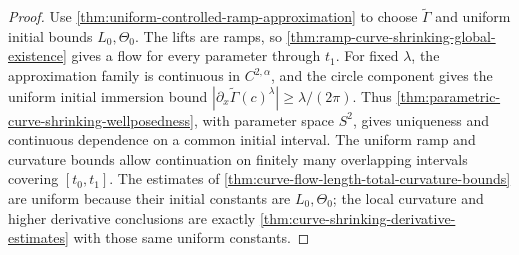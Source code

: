 \begin{proof}
Use \ref{thm:uniform-controlled-ramp-approximation} to choose
$\widetilde\Gamma$ and uniform initial bounds $L_0,\Theta_0$.  The lifts are
ramps, so \ref{thm:ramp-curve-shrinking-global-existence} gives a flow for
every parameter through $t_1$.  For fixed $\lambda$, the approximation family
is continuous in $C^{2,\alpha}$, and the circle component gives the uniform
initial immersion bound $|\partial_x\widetilde\Gamma(c)^\lambda|
\ge\lambda/(2\pi)$.  Thus
\ref{thm:parametric-curve-shrinking-wellposedness}, with parameter space
$S^2$, gives uniqueness and continuous dependence on a common initial
interval.  The uniform ramp and curvature bounds allow continuation on
finitely many overlapping intervals covering $[t_0,t_1]$.  The estimates of
\ref{thm:curve-flow-length-total-curvature-bounds} are uniform because their
initial constants are $L_0,\Theta_0$; the local curvature and higher
derivative conclusions are exactly
\ref{thm:curve-shrinking-derivative-estimates} with those same uniform
constants.
\end{proof}
